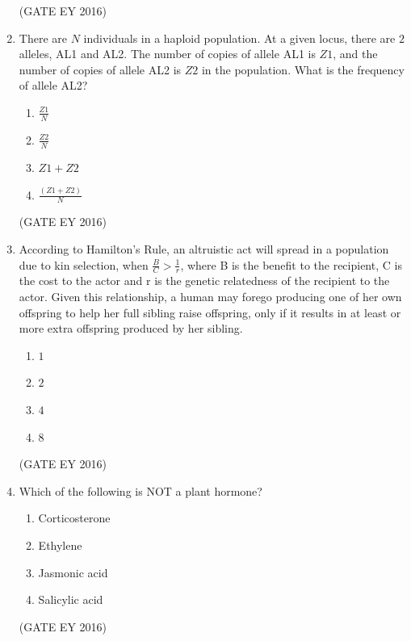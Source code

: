\documentclass[journal]{IEEEtran}
\begin{document}
\begin{enumerate}
\hfill{(GATE EY 2016)}

\item There are $N$ individuals in a haploid population. At a given locus, there are $2$ alleles, AL1 and AL2. The number of copies of allele AL1 is $Z1$, and the number of copies of allele AL2 is $Z2$ in the population. What is the frequency of allele AL2?
\begin{multicols}{4}
\begin{enumerate}
    \item $\frac{Z1}{N}$
    \item $\frac{Z2}{N}$
    \item $Z1+Z2$
    \item $\frac{(Z1+Z2)}{N}$
\end{enumerate}
\end{multicols}
\hfill{(GATE EY 2016)}

\item According to Hamilton's Rule, an altruistic act will spread in a population due to kin selection, when $\frac{B}{C} > \frac{1}{r}$, where B is the benefit to the recipient, C is the cost to the actor and r is the genetic relatedness of the recipient to the actor. Given this relationship, a human may forego producing one of her own offspring to help her full sibling raise offspring, only if it results in at least \underline{\hspace{1cm}} or more extra offspring produced by her sibling.
\begin{multicols}{4}
\begin{enumerate}
    \item $1$
    \item $2$
    \item $4$
    \item $8$
\end{enumerate}
\end{multicols}
\hfill{(GATE EY 2016)}

\item Which of the following is NOT a plant hormone?
\begin{multicols}{4}
\begin{enumerate}
    \item Corticosterone
    \item Ethylene
    \item Jasmonic acid
    \item Salicylic acid
\end{enumerate}
\end{multicols}
\hfill{(GATE EY 2016)}


\end{enumerate}
\end{document}
